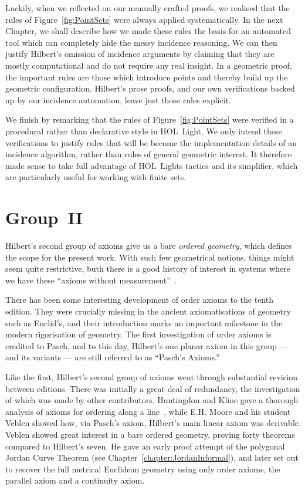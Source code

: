 Luckily, when we reflected on our manually crafted proofs, we realised that the rules of Figure~\ref{fig:PointSets} were always applied systematically. In the next Chapter, we shall describe how we made these rules the basis for an automated tool which can completely hide the messy incidence reasoning. We can then justify Hilbert's omission of incidence arguments by claiming that they are mostly computational and do not require any real insight. In a geometric proof, the important rules are those which introduce points and thereby build up the geometric configuration. Hilbert's prose proofs, and our own verifications backed up by our incidence automation, leave just those rules explicit.

We finish by remarking that the rules of Figure~\ref{fig:PointSets} were verified in a procedural rather than declarative style in HOL~Light. We only intend these verifications to justify rules that will be become the implementation details of an incidence algorithm, rather than rules of general geometric interest. It therefore made sense to take full advantage of HOL~Lights tactics and its simplifier, which are particularly useful for working with finite sets.  

\section{Group~II}
Hilbert's second group of axioms give us a bare \emph{ordered geometry}, which defines the scope for the present work. With such few geometrical notions, things might seem quite restrictive, buth there is a good history of interest in systems where we have these ``axioms without measurement''~\cite{AxiomaticsOrderedGeometry}. 

There has been some interesting development of order axioms to the tenth edition. They were crucially missing in the ancient axiomatisations of geometry such as Euclid's, and their introduction marks an important milestone in the modern rigorisation of geometry. The first investigation of order axioms is credited to Pasch, and to this day, Hilbert's one planar axiom in this group --- and its variants --- are still referred to as ``Pasch's Axioms.''

Like the first, Hilbert's second group of axioms went through substantial revision between editions. There was initially a great deal of redundancy, the investigation of which was made by other contributors. Huntingdon and Kline gave a thorough analysis of axioms for ordering along a line~\cite{AnalysisBetweenness}, while E.H. Moore and his student Veblen showed how, via Pasch's axiom, Hilbert's main linear axiom was derivable. Veblen showed great interest in a bare ordered geometry, proving forty theorems compared to Hilbert's seven. He gave an early proof attempt of the polygonal Jordan Curve Theorem (see Chapter~\ref{chapter:JordanInformal}), and later set out to recover the full metrical Euclidean geometry using only order axioms, the parallel axiom and a continuity axiom.

